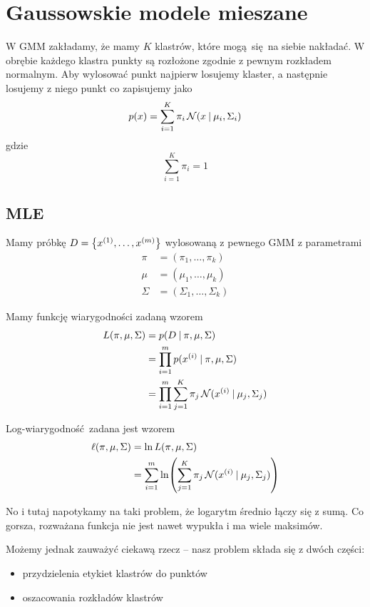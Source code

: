 \section{Gaussowskie modele mieszane}

W GMM zakładamy, że mamy \( K \) klastrów, które mogą się na siebie nakładać.
W obrębie każdego klastra punkty są rozłożone zgodnie z pewnym rozkładem normalnym.
Aby wylosować punkt najpierw losujemy klaster, a następnie losujemy z niego punkt co zapisujemy jako
\[
	p(x) = \sum_{i=1}^K \pi_i \operatorname{\mathcal{N}}(x \:\vert\: \mu_i, \Sigma_i)
\]
gdzie
\[
	\sum_{i=1}^K \pi_i = 1
\]

\subsection{MLE}

Mamy próbkę \( D = \set{x^{(1)}, \dots, x^{(m)}} \) wylosowaną z pewnego GMM z parametrami
\begin{align*}
	\pi    & = (\pi_1, \dots, \pi_k)       \\
	\mu    & = (\mu_1, \dots, \mu_k)       \\
	\Sigma & = (\Sigma_1, \dots, \Sigma_k)
\end{align*}

Mamy funkcję wiarygodności zadaną wzorem
\begin{align*}
	L(\pi, \mu, \Sigma)
	 & = p(D \:\vert\: \pi, \mu, \Sigma)                                            \\
	 & = \prod_{i=1}^m p(x^{(i)} \:\vert\: \pi, \mu, \Sigma)                        \\
	 & = \prod_{i=1}^m \sum_{j=1}^K \pi_j\operatorname{\mathcal{N}}(x^{(i)} \:\vert\: \mu_j, \Sigma_j)
\end{align*}

Log-wiarygodność zadana jest wzorem
\begin{align*}
	\ell(\pi, \mu, \Sigma)
	 & = \ln L(\pi, \mu, \Sigma)                                                           \\
	 & = \sum_{i=1}^m \ln \pars{\sum_{j=1}^K \pi_j\Normal(x^{(i)} \given \mu_j, \Sigma_j)}
\end{align*}

No i tutaj napotykamy na taki problem, że logarytm średnio łączy się z sumą.
Co gorsza, rozważana funkcja nie jest nawet wypukła i ma wiele maksimów.

Możemy jednak zauważyć ciekawą rzecz -- nasz problem składa się z dwóch części:
\begin{itemize}
	\item przydzielenia etykiet klastrów do punktów
	\item oszacowania rozkładów klastrów
\end{itemize}

